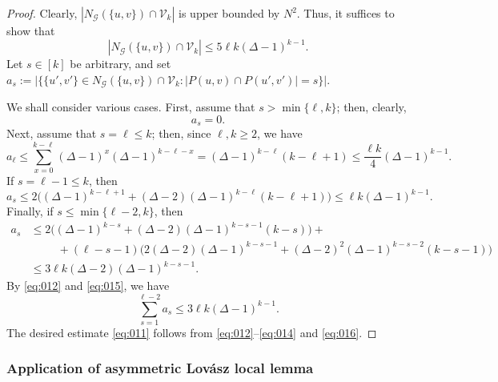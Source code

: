 \documentclass[11pt,leqno]{amsart}
\theoremstyle{remark}
\theoremstyle{plain}
\begin{document}
\begin{proof}
Clearly, $|N_\mathcal{G}(\{u,v\})\cap \mathcal{V}_k|$ is upper bounded by $N^2$. Thus, it suffices to show that
\begin{equation} \label{eq:011}
|N_\mathcal{G}(\{u,v\})\cap  \mathcal{V}_k|\leqslant 5\ell k (\Delta-1)^{k-1}.
\end{equation}
Let $s\in [k]$ be arbitrary, and set $a_s := \big|\big\{\{u',v'\}\in N_\mathcal{G}(\{u,v\})\cap  \mathcal{V}_k\colon |P(u,v)\cap P(u',v')|=s\big\}\big|$.

We shall consider various cases. First, assume that $s>\min\{\ell,k\}$; then, clearly,
\begin{equation}\label{eq:012}
a_s=0.
\end{equation}
Next, assume that $s=\ell\leqslant k$; then, since $\ell,k\geqslant 2$, we have
\begin{equation}\label{eq:013}
a_\ell \leqslant \sum_{x=0}^{k-\ell}(\Delta-1)^x(\Delta-1)^{k-\ell-x} = (\Delta-1)^{k-\ell}(k-\ell+1)
\leqslant \frac{\ell k}{4}(\Delta-1)^{k-1}.
\end{equation}
If $s = \ell-1 \leqslant k$, then
\begin{equation} \label{eq:014}
a_s \leqslant
2\big( (\Delta-1)^{k-\ell+1} + (\Delta-2)(\Delta-1)^{k-\ell}(k-\ell+1) \big)
\leqslant \ell k (\Delta-1)^{k-1}.%
\end{equation}
Finally, if $s \leqslant \min\{\ell-2 , k\}$, then
\begin{align} \label{eq:015}
a_s & \leqslant 2 \big( (\Delta-1)^{k-s} +(\Delta -2)(\Delta-1)^{k-s-1}(k-s)\big) + \\
& \ \ \ \ \ \ \ \ \ \ \
+ (\ell-s-1) \big( 2(\Delta-2)(\Delta-1)^{k-s-1} +(\Delta-2)^2(\Delta-1)^{k-s-2}(k-s-1)  \big) \nonumber \\
& \leqslant 3\ell k(\Delta-2)(\Delta-1)^{k-s-1}. \nonumber
\end{align}
By \eqref{eq:012} and \eqref{eq:015}, we have
\begin{equation} \label{eq:016}
\sum_{s=1}^{\ell-2}a_s\leqslant 3\ell k(\Delta-1)^{k-1}.
\end{equation}
The desired estimate \eqref{eq:011} follows from \eqref{eq:012}--\eqref{eq:014} and \eqref{eq:016}.
\end{proof}

\subsubsection{Application of asymmetric Lovász local lemma}
\end{document}
